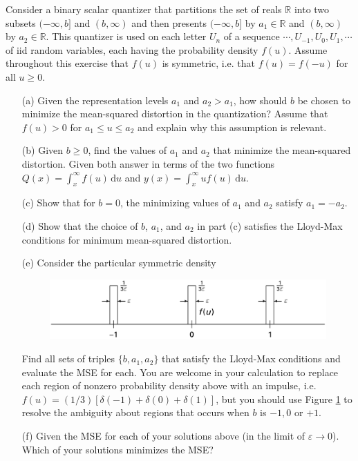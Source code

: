 \documentclass{assignment}
\begin{document}
\begin{prob}[3.3]
    Consider a binary scalar quantizer that partitions the set of reals $\mathbb{R}$ into two subsets $(-\infty,b]$ and $(b,\infty)$ and then presents $(-\infty,b]$ by $a_1\in\mathbb{R}$ and $(b,\infty)$ by $a_2\in\mathbb{R}$. This quantizer is used on each letter $U_n$ of a sequence $\cdots,U_{-1},U_0,U_1,\cdots$ of iid random variables, each having the probability density $f(u)$. Assume throughout this exercise that $f(u)$ is symmetric, i.e. that $f(u)=f(-u)$ for all $u\geq 0$.
    \begin{itemize}
        \item[(a)] Given the representation levels $a_1$ and $a_2>a_1$, how should $b$ be chosen to minimize the mean-squared distortion in the quantization? Assume that $f(u)>0$ for $a_1\leq u\leq a_2$ and explain why this assumption is relevant.
        \item[(b)] Given $b\geq 0$, find the values of $a_1$ and $a_2$ that minimize the mean-squared distortion. Given both answer in terms of the two functions $Q(x)=\int_x^{\infty}f(u)\,\mathrm{d}u$ and $y(x)=\int_x^{\infty}uf(u)\,\mathrm{d}u$.
        \item[(c)] Show that for $b=0$, the minimizing values of $a_1$ and $a_2$ satisfy $a_1=-a_2$.
        \item[(d)] Show that the choice of $b$, $a_1$, and $a_2$ in part (c) satisfies the Lloyd-Max conditions for minimum mean-squared distortion.
        \item[(e)] Consider the particular symmetric density
        \begin{figure}[H]
            \centering
            \includegraphics[width=.5\columnwidth]{A-9-P-1.png}
            \caption{}
            \label{A-9-P-1}
        \end{figure}
        Find all sets of triples $\{b,a_1,a_2\}$ that satisfy the Lloyd-Max conditions and evaluate the MSE for each. You are welcome in your calculation to replace each region of nonzero probability density above with an impulse, i.e. $f(u)=(1/3)[\delta(-1)+\delta(0)+\delta(1)]$, but you should use Figure \ref{A-9-P-1} to resolve the ambiguity about regions that occurs when $b$ is $-1,0$ or $+1$.
        \item[(f)] Given the MSE for each of your solutions above (in the limit of $\varepsilon\rightarrow 0$). Which of your solutions minimizes the MSE?
    \end{itemize}
\end{prob}
\end{document}
